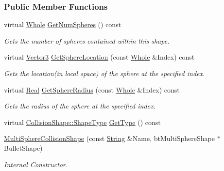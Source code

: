 \subsubsection*{Public Member Functions}
\begin{DoxyCompactItemize}
\item 
virtual \hyperlink{namespacephys_a460f6bc24c8dd347b05e0366ae34f34a}{Whole} \hyperlink{classphys_1_1MultiSphereCollisionShape_a9ee3a0486e1da5fb712674ac2c5cefed}{GetNumSpheres} () const 
\begin{DoxyCompactList}\small\item\em Gets the number of spheres contained within this shape. \item\end{DoxyCompactList}\item 
virtual \hyperlink{classphys_1_1Vector3}{Vector3} \hyperlink{classphys_1_1MultiSphereCollisionShape_aa0c7348084888d2dc7d89f57341fb5bf}{GetSphereLocation} (const \hyperlink{namespacephys_a460f6bc24c8dd347b05e0366ae34f34a}{Whole} \&Index) const 
\begin{DoxyCompactList}\small\item\em Gets the location(in local space) of the sphere at the specified index. \item\end{DoxyCompactList}\item 
virtual \hyperlink{namespacephys_af7eb897198d265b8e868f45240230d5f}{Real} \hyperlink{classphys_1_1MultiSphereCollisionShape_a231501da6e60f37b2795595599130dca}{GetSphereRadius} (const \hyperlink{namespacephys_a460f6bc24c8dd347b05e0366ae34f34a}{Whole} \&Index) const 
\begin{DoxyCompactList}\small\item\em Gets the radius of the sphere at the specified index. \item\end{DoxyCompactList}\item 
virtual \hyperlink{classphys_1_1CollisionShape_af3ba4fd8af5b9557f912d2f5ff35a588}{CollisionShape::ShapeType} \hyperlink{classphys_1_1MultiSphereCollisionShape_aa0822886f961c6b8ace312c90a3e4d99}{GetType} () const 
\item 
\hyperlink{classphys_1_1MultiSphereCollisionShape_a60a28ddcd77ee2a5647da6aa08b7fda4}{MultiSphereCollisionShape} (const \hyperlink{namespacephys_aa03900411993de7fbfec4789bc1d392e}{String} \&Name, btMultiSphereShape $\ast$BulletShape)
\begin{DoxyCompactList}\small\item\em Internal Constructor. \item\end{DoxyCompactList}\item 

\end{DoxyCompactItemize}
